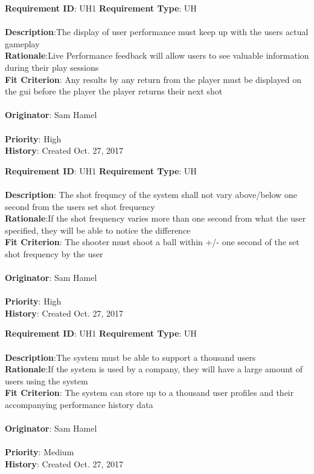 \documentclass[11pt]{article}
\begin{document}
\begin{framed}
	\noindent\textbf{Requirement ID}: UH1 \hfill \textbf{Requirement Type}: UH \hfill\\\\
	\noindent\textbf{Description}:The display of user performance must keep up with the users actual gameplay  \\
	\textbf{Rationale}:Live Performance feedback will allow users to see valuable information during their play sessions \\
	\textbf{Fit Criterion}: Any results by any return from the player must be displayed on the gui before the player the player returns their next shot  \\\\
	\textbf{Originator}: Sam Hamel \\\\
	\textbf{Priority}: High \hfill \\
	\noindent\textbf{History}: Created Oct. 27, 2017
\end{framed}

\begin{framed}
	\noindent\textbf{Requirement ID}: UH1 \hfill \textbf{Requirement Type}: UH \hfill\\\\
	\noindent\textbf{Description}: The shot frequncy of the system shall not vary above/below one second from the users set shot frequency  \\
	\textbf{Rationale}:If the shot frequency varies more than one second from what the user specified, they will be able to notice the difference \\
	\textbf{Fit Criterion}: The shooter must shoot a ball within +/- one second of the set shot frequency by the user\\\\
	\textbf{Originator}: Sam Hamel \\\\
	\textbf{Priority}: High \hfill \\
	\noindent\textbf{History}: Created Oct. 27, 2017
\end{framed}

\begin{framed}
	\noindent\textbf{Requirement ID}: UH1 \hfill \textbf{Requirement Type}: UH \hfill\\\\
	\noindent\textbf{Description}:The system must be able to support a thousand users \\
	\textbf{Rationale}:If the system is used by a company, they will have a large amount of users using the system  \\
	\textbf{Fit Criterion}: The system can store up to a thousand user profiles and their accompanying performance history data  \\\\
	\textbf{Originator}: Sam Hamel \\\\
	\textbf{Priority}: Medium \hfill \\
	\noindent\textbf{History}: Created Oct. 27, 2017
\end{framed}
\end{document}
